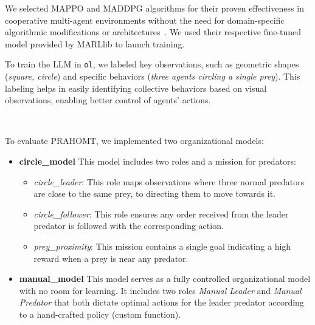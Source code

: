 \documentclass[runningheads]{llncs}
\theoremstyle{freethm}
\theoremstyle{proofoutline}
\begin{document}
\noindent We selected MAPPO and MADDPG algorithms for their proven effectiveness in cooperative multi-agent environments without the need for domain-specific algorithmic modifications or architectures~\cite{Yu2022}. We used their respective fine-tuned model provided by MARLlib to launch training.

\noindent To train the LLM in \texttt{ol}, we labeled key observations, such as geometric shapes (\textit{square, circle}) and specific behaviors (\textit{three agents circling a single prey}). This labeling helps in easily identifying collective behaviors based on visual observations, enabling better control of agents' actions.

\

\noindent To evaluate PRAHOMT, we implemented two organizational models:

\begin{itemize}
    \item \textbf{circle\_model} \quad This model includes two roles and a mission for predators:
          \begin{itemize}
              \item \textit{circle\_leader}: This role maps observations where three normal predators are close to the same prey, to directing them to move towards it.
              \item \textit{circle\_follower}: This role ensures any order received from the leader predator is followed with the corresponding action.
              \item \textit{prey\_proximity}: This mission contains a single goal indicating a high reward when a prey is near any predator.
          \end{itemize}

    \item \textbf{manual\_model} \quad This model serves as a fully controlled organizational model with no room for learning. It includes two roles \textit{Manual Leader} and \textit{Manual Predator} that both dictate optimal actions for the leader predator according to a hand-crafted policy (custom function).
\end{itemize}
\end{document}
